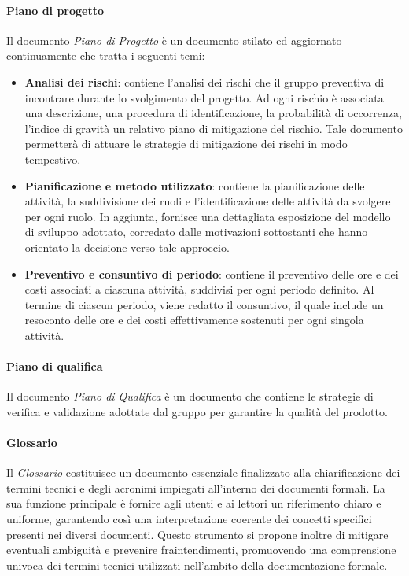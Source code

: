 \paragraph{Piano di progetto}
Il documento \textit{Piano di Progetto} è un documento stilato ed aggiornato continuamente che tratta i seguenti temi:
\begin{itemize}
    \item \textbf{Analisi dei rischi}: contiene l'analisi dei rischi che il gruppo preventiva di incontrare durante lo svolgimento del progetto. Ad ogni rischio è associata una descrizione, una procedura di identificazione, la probabilità di occorrenza, l'indice di gravità un relativo piano di mitigazione del rischio. Tale documento permetterà di attuare le strategie di mitigazione dei rischi in modo tempestivo.
    \item \textbf{Pianificazione e metodo utilizzato}: contiene la pianificazione delle attività, la suddivisione dei ruoli e l'identificazione delle attività da svolgere per ogni ruolo. In aggiunta, fornisce una dettagliata esposizione del modello di sviluppo adottato, corredato dalle motivazioni sottostanti che hanno orientato la decisione verso tale approccio.
    \item \textbf{Preventivo e consuntivo di periodo}: contiene il preventivo  delle ore e dei costi associati a ciascuna attività, suddivisi per ogni periodo definito. Al termine di ciascun periodo, viene redatto il consuntivo, il quale include un resoconto delle ore e dei costi effettivamente sostenuti per ogni singola attività.
\end{itemize}

\paragraph{Piano di qualifica}
Il documento \textit{Piano di Qualifica} è un documento che contiene le strategie di verifica e validazione adottate dal gruppo per garantire la qualità del prodotto.
\begin{comment}
    Da implementare di seguito appena so cosa c'è presente nel piano di qualifica
\end{comment}

\paragraph{Glossario}
Il \textit{Glossario} costituisce un documento essenziale finalizzato alla chiarificazione dei termini tecnici e degli acronimi impiegati all'interno dei documenti formali. La sua funzione principale è fornire agli utenti e ai lettori un riferimento chiaro e uniforme, garantendo così una interpretazione coerente dei concetti specifici presenti nei diversi documenti. Questo strumento si propone inoltre di mitigare eventuali ambiguità e prevenire fraintendimenti, promuovendo una comprensione univoca dei termini tecnici utilizzati nell'ambito della documentazione formale.

